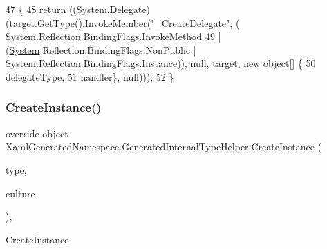 \begin{DoxyCode}
47                                                                                                            
              \{
48             \textcolor{keywordflow}{return} ((\hyperlink{namespaceSystem}{System}.Delegate)(target.GetType().InvokeMember(\textcolor{stringliteral}{"\_CreateDelegate"}, (
      \hyperlink{namespaceSystem}{System}.Reflection.BindingFlags.InvokeMethod 
49                             | (\hyperlink{namespaceSystem}{System}.Reflection.BindingFlags.NonPublic | 
      \hyperlink{namespaceSystem}{System}.Reflection.BindingFlags.Instance)), null, target, \textcolor{keyword}{new} \textcolor{keywordtype}{object}[] \{
50                         delegateType,
51                         handler\}, null)));
52         \}
\end{DoxyCode}
\mbox{\label{classXamlGeneratedNamespace_1_1GeneratedInternalTypeHelper_aefb7a98fceb9c287cef4756942f441d1}} 
\subsubsection{\texorpdfstring{Create\+Instance()}{CreateInstance()}\hspace{0.1cm}{\footnotesize\ttfamily [1/3]}}
{\footnotesize\ttfamily override object Xaml\+Generated\+Namespace.\+Generated\+Internal\+Type\+Helper.\+Create\+Instance (\begin{DoxyParamCaption}\item[{System.\+Type}]{type,  }\item[{System.\+Globalization.\+Culture\+Info}]{culture }\end{DoxyParamCaption})\hspace{0.3cm}{\ttfamily [inline]}, {\ttfamily [protected]}}



Create\+Instance 


